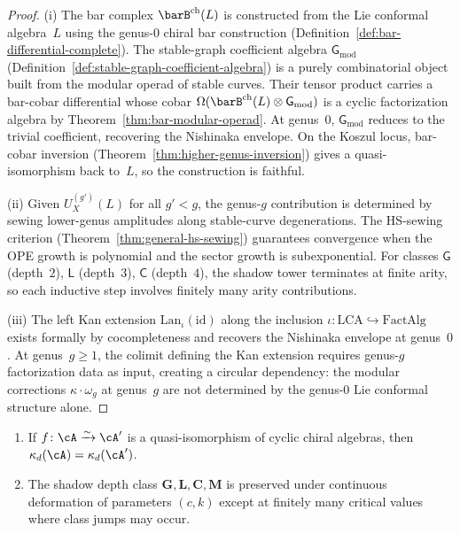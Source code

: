 \begin{proof}
\textup{(i)}
The bar complex $\barB^{\mathrm{ch}}(L)$ is constructed from the
Lie conformal algebra~$L$ using the genus-$0$ chiral bar
construction
(Definition~\ref{def:bar-differential-complete}).
The stable-graph coefficient algebra $\mathsf{G}_{\mathrm{mod}}$
(Definition~\ref{def:stable-graph-coefficient-algebra}) is a purely
combinatorial object built from the modular operad of stable curves.
Their tensor product carries a bar-cobar differential whose cobar
$\Omega(\barB^{\mathrm{ch}}(L) \otimes \mathsf{G}_{\mathrm{mod}})$
is a cyclic factorization algebra by
Theorem~\ref{thm:bar-modular-operad}.  At genus~$0$,
$\mathsf{G}_{\mathrm{mod}}$ reduces to the trivial coefficient,
recovering the Nishinaka envelope.  On the Koszul locus,
bar-cobar inversion
(Theorem~\ref{thm:higher-genus-inversion}) gives a
quasi-isomorphism back to~$L$, so the construction is faithful.

\smallskip\noindent\textup{(ii)}
Given $U^{(g')}_X(L)$ for all $g' < g$, the genus-$g$ contribution
is determined by sewing lower-genus amplitudes along stable-curve
degenerations.  The HS-sewing criterion
(Theorem~\ref{thm:general-hs-sewing}) guarantees convergence when
the OPE growth is polynomial and the sector growth is
subexponential.  For classes $\mathsf{G}$ (depth~$2$),
$\mathsf{L}$ (depth~$3$), $\mathsf{C}$ (depth~$4$), the shadow
tower terminates at finite arity, so each inductive step involves
finitely many arity contributions.

\smallskip\noindent\textup{(iii)}
The left Kan extension $\mathrm{Lan}_\iota(\mathrm{id})$ along the
inclusion $\iota\colon \mathrm{LCA} \hookrightarrow
\mathrm{FactAlg}$ exists formally by cocompleteness and recovers
the Nishinaka envelope at genus~$0$.  At genus~$g \geq 1$, the
colimit defining the Kan extension requires genus-$g$
factorization data as input, creating a circular dependency: the
modular corrections $\kappa \cdot \omega_g$ at genus~$g$ are not
determined by the genus-$0$ Lie conformal structure alone.
\end{proof}

\begin{theorem}
\label{conj:shadow-depth-invariant}
\ClaimStatusProvedHere
{}
\begin{enumerate}[label=\textup{(\roman*)}]
\item If $f\colon \cA \xrightarrow{\sim} \cA'$ is a
  quasi-isomorphism of cyclic chiral algebras, then
  $\kappa_d(\cA) = \kappa_d(\cA')$.
\item The shadow depth class
  $\mathbf{G}, \mathbf{L}, \mathbf{C}, \mathbf{M}$
  is preserved under continuous deformation of
  parameters $(c, k)$ except at finitely many critical
  values where class jumps may occur.
\end{enumerate}
\end{theorem}

